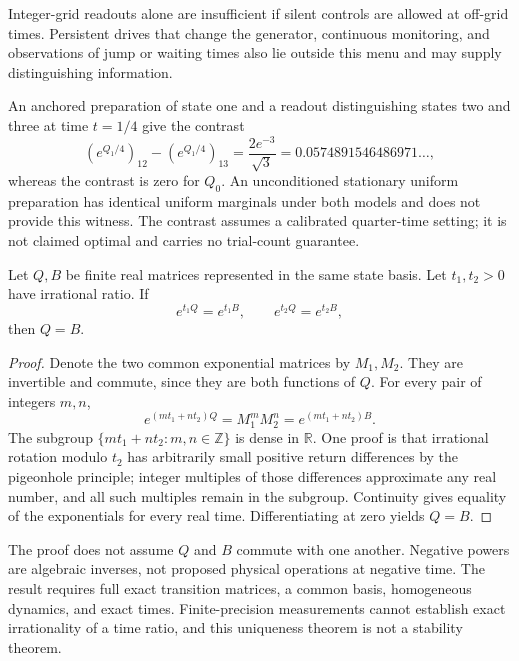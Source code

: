 Integer-grid readouts alone are insufficient if silent controls are
allowed at off-grid times.  Persistent drives that change the generator,
continuous monitoring, and observations of jump or waiting times also
lie outside this menu and may supply distinguishing information.

An anchored preparation of state one and a readout distinguishing
states two and three at time \(t=1/4\) give the contrast
\[
 (e^{Q_1/4})_{12}-(e^{Q_1/4})_{13}
 =\frac{2e^{-3}}{\sqrt3}
 =0.0574891546486971\ldots ,
\]
whereas the contrast is zero for \(Q_0\).
An unconditioned stationary uniform preparation has identical uniform
marginals under both models and does not provide this witness.
The contrast assumes a calibrated quarter-time setting; it is not
claimed optimal and carries no trial-count guarantee.

\begin{theorem}
\label{op:two-times}
Let \(Q,B\) be finite real matrices represented in the same state basis.
Let \(t_1,t_2>0\) have irrational ratio.
If
\[
 e^{t_1Q}=e^{t_1B},\qquad e^{t_2Q}=e^{t_2B},
\]
then \(Q=B\).
\end{theorem}
\begin{proof}
Denote the two common exponential matrices by \(M_1,M_2\).
They are invertible and commute, since they are both functions of \(Q\).
For every pair of integers \(m,n\),
\[
 e^{(mt_1+nt_2)Q}=M_1^mM_2^n=e^{(mt_1+nt_2)B}.
\]
The subgroup \(\{mt_1+nt_2:m,n\in\mathbb Z\}\) is dense in
\(\mathbb R\).  One proof is that irrational rotation modulo \(t_2\)
has arbitrarily small positive return differences by the pigeonhole
principle; integer multiples of those differences approximate any
real number, and all such multiples remain in the subgroup.
Continuity gives equality of the exponentials for every real time.
Differentiating at zero yields \(Q=B\).
\end{proof}

The proof does not assume \(Q\) and \(B\) commute with one another.
Negative powers are algebraic inverses, not proposed physical operations
at negative time.  The result requires full exact transition matrices,
a common basis, homogeneous dynamics, and exact times.
Finite-precision measurements cannot establish exact irrationality of
a time ratio, and this uniqueness theorem is not a stability theorem.

